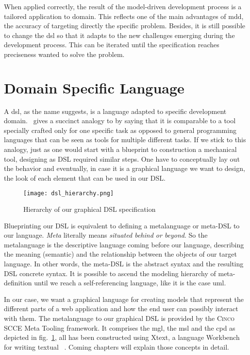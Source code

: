 When applied correctly, the result of the model-driven development process is a tailored application to domain. This reflects one of the main advantages of \acrshort{mdd}, the accuracy of targeting directly the specific problem. Besides, it is still possible to change the \acrshort{dsl} so that it adapts to the new challenges emerging during the development process. This can be iterated until the specification reaches preciseness wanted to solve the problem.

\section{Domain Specific Language}

A \acrfull{dsl}, as the name suggests, is a language adapted to specific development domain.~\cite{Naujokat2018} gives a succinct analogy to  by saying that it is comparable to a tool specially crafted only for one specific task as opposed to general programming languages that can be seen as tools for multiple different tasks. If we stick to this analogy, just as one would start with a blueprint to construction a mechanical tool, designing as DSL required similar steps. One have to conceptually lay out the behavior and eventually, in case it is a graphical language we want to design, the look of each element that can be used in our DSL.

\begin{figure}[H]
    \centering
    \texttt{[image: dsl\_hierarchy.png]}
    \caption{Hierarchy of our graphical DSL specification}
    \label{fig:modeling-hierachy}
\end{figure}

Blueprinting our DSL is equivalent to defining a metalanguage or meta-DSL to our language. \textit{Meta} literally means \textit{situated behind or beyond}. So the metalanguage is the descriptive language coming before our language, describing the meaning (semantic) and the relationship between the objects of our target language. In other words, the meta-DSL is the abstract syntax and the resulting DSL concrete syntax. It is possible to ascend the modeling hierarchy of meta-definition until we reach a self-referencing language, like it is the case \acrfull{uml}.

In our case, we want a graphical language for creating models that represent the different parts of a web application and how the end user can possibly interact with them. The metalanguage to our graphical DSL is provided by the \textsc{Cinco} SCCE Meta Tooling framework. It comprises the \acrfull{mgl}, the \acrfull{msl} and the \acrfull{cpd} as depicted in fig.~\ref{fig:modeling-hierachy}, all has been constructed using Xtext, a language Workbench for writing textual ~\cite{naujokat-diss}. Coming chapters will explain those concepts in detail.

